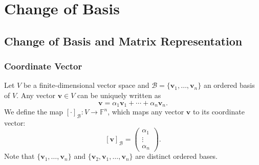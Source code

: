 \chapter{Change of Basis}
\section{Change of Basis and Matrix Representation}
\subsection{Coordinate Vector}

\begin{definition}\label{def:coordinate_vector}
 Let \(V\) be a finite-dimensional vector space and \(\mathcal{B} = \{ \mathbf{v}_1, \ldots, \mathbf{v}_n \}\) an ordered basis of \(V\). Any vector \(\mathbf{v} \in V\) can be uniquely written as
\[
\mathbf{v} = \alpha_1 \mathbf{v}_1 + \cdots + \alpha_n \mathbf{v}_n.
\]
We define the map \([ \cdot ]_{\mathcal{B}} : V \rightarrow \mathbb{F}^n\), which maps any vector \(\mathbf{v}\) to its coordinate vector:
\[
[ \mathbf{v} ]_{\mathcal{B}} = \begin{pmatrix} \alpha_1 \\ \vdots \\ \alpha_n \end{pmatrix}.
\]
Note that \(\{ \mathbf{v}_1, \ldots, \mathbf{v}_n \}\) and \(\{ \mathbf{v}_2, \mathbf{v}_1, \ldots, \mathbf{v}_n \}\) are distinct ordered bases.
\end{definition}

